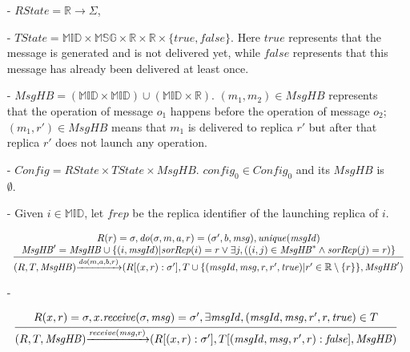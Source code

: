 \begin{itemize}
\setlength{\itemsep}{0.5pt}
\item[-] $\mathit{RState} = \mathbb{R} \rightarrow \Sigma$,

\item[-] $\mathit{TState} = \mathbb{MID} \times \mathbb{MSG} \times \mathbb{R} \times \mathbb{R} \times \{ \mathit{true},\mathit{false} \}$. Here $\mathit{true}$ represents that the message is generated and is not delivered yet, while $\mathit{false}$ represents that this message has already been delivered at least once.

\item[-] $\mathit{MsgHB} = (\mathbb{MID} \times \mathbb{MID}) \cup (\mathbb{MID} \times \mathbb{R})$. $(m_1,m_2) \in \mathit{MsgHB}$ represents that the operation of message $o_1$ happens before the operation of message $o_2$; $(m_1,r') \in \mathit{MsgHB}$ means that $m_1$ is delivered to replica $r'$ but after that replica $r'$ does not launch any operation. 

\item[-] $\mathit{Config} = \mathit{RState} \times \mathit{TState} \times \mathit{MsgHB}$. $\mathit{config}_0 \in \mathit{Config}_0$ and its $\mathit{MsgHB}$ is $\emptyset$. 

\item[-] Given $i \in \mathbb{MID}$, let $\mathit{frep}$ be the replica identifier of the launching replica of $i$. 

$\begin{array}{l c}
   \bigfrac{
   \begin{array}{c}
     R(r) = \sigma, \mathit{do}(\sigma,m,a,r) = (\sigma',b,\mathit{msg}), \mathit{unique}(\mathit{msgId})\\
     \mathit{MsgHB}' = \mathit{MsgHB} \cup \{ (i,\mathit{msgId}) \vert \mathit{sorRep}(i) = r \vee \exists j, ( (i,j) \in \mathit{MsgHB}^* \wedge \mathit{sorRep}(j) = r) \}
   \end{array}}
     {(R,T,\mathit{MsgHB}) {\xrightarrow{\mathit{do}(m,a,b,r)}} (R[(x,r):\sigma'],T \cup \{ (\mathit{msgId},\mathit{msg},r,r',\mathit{true}) \vert r' \in \mathbb{R} \setminus \{ r \} \},\mathit{MsgHB}')}
\end{array}$

\item[-]

$\begin{array}{l c}
   \bigfrac{
   \begin{array}{c}
      R(x,r) = \sigma, x.\mathit{receive}(\sigma,\mathit{msg}) = \sigma',\exists \mathit{msgId},(\mathit{msgId},\mathit{msg},r',r,\mathit{true}) \in T
   \end{array}}
     {(R,T,\mathit{MsgHB}) {\xrightarrow{\mathit{receive}(\mathit{msg},r)}} (R[(x,r):\sigma'],T[(\mathit{msgId},\mathit{msg},r',r):\mathit{false}],\mathit{MsgHB})}
\end{array}$
\end{itemize} 




